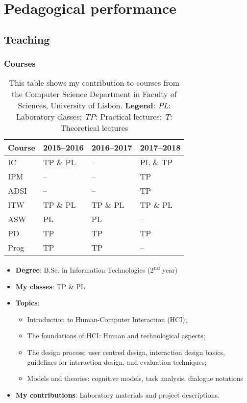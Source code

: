 \section{Pedagogical performance}

\subsection{Teaching}

\subsubsection{Courses}
\vspace{-1.5\baselineskip}
\begin{table}[H]
\centering
\caption{This table shows my contribution to courses from the Computer Science Department in Faculty of Sciences, University of Lisbon.\hfill\break
\textbf{Legend}:
\textit{PL}: Laboratory classes;
\textit{TP}: Practical lectures;
\textit{T}:  Theoretical lectures}
\label{tab:courses}
\begin{tabular}{llll}
\toprule
\bfseries Course & \bfseries 2015--2016 & \bfseries 2016--2017 & \bfseries 2017--2018 \\
\midrule
IC   & TP \& PL & --       & PL \& TP \\
IPM  & --       & --       & TP \\
ADSI & --       & --       & TP \\
ITW  & TP \& PL & TP \& PL & TP \& PL \\
ASW  & PL       & PL       & -- \\
PD   & TP       & TP       & TP \\
Prog & TP       & TP       & -- \\
\bottomrule
\end{tabular}
\end{table}

\begin{itemize}
    \item \textbf{Degree}: B.Sc. in Information Technologies (2\textsuperscript{nd} year)
    \item \textbf{My classes}: TP \& PL
    \item \textbf{Topics}:
    \begin{itemize}
        \item Introduction to Human-Computer Interaction (HCI);
        \item The foundations of HCI: Human and technological aspects;
        \item The design process: user centred design, interaction design basics, guidelines for interaction design, and evaluation techniques;
        \item Models and theories: cognitive models, task analysis, dialogue notations
    \end{itemize}
    \item \textbf{My contributions}: Laboratory materials and project descriptions.
\end{itemize}

